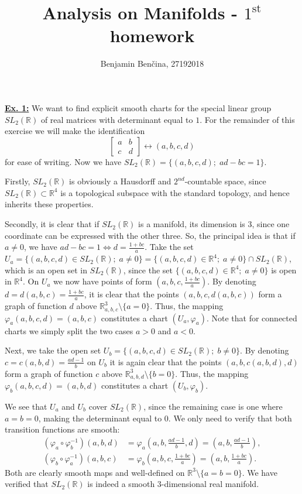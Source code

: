 \documentclass[a4paper, 12pt]{article} %
\title{Analysis on Manifolds - $1^{\text{st}}$ homework}
\author{Benjamin Benčina, 27192018}
\newcommand{\R}{\mathbb{R}}
\begin{document}
\maketitle

\underline{\textbf{Ex. 1:}}
We want to find explicit smooth charts for the special linear group $SL_2(\R)$ of real matrices with determinant equal to $1$. For the remainder of this exercise we will make the identification
\[
\begin{bmatrix}
a & b \\
c & d
\end{bmatrix}
\longleftrightarrow (a, b, c, d)
\]
for ease of writing. Now we have $SL_2(\R) = \lbrace (a, b, c, d) ; \; ad-bc=1\rbrace$.

Firstly, $SL_2(\R)$ is obviously a Hausdorff and $2^{nd}$-countable space, since $SL_2(\R) \subset \R^4$ is a topological subspace with the standard topology, and hence inherits these properties.

Secondly, it is clear that if $SL_2(\R)$ is a manifold, its dimension is $3$, since one coordinate can be expressed with the other three. So, the principal idea is that if $a \neq 0$, we have $ad-bc = 1 \iff d = \frac{1+bc}{a}$. Take the set $U_a = \lbrace (a, b, c, d) \in SL_2(\R) ; \; a \neq 0 \rbrace = \lbrace (a, b, c, d) \in \R^4 ; \; a \neq 0 \rbrace \cap SL_2(\R)$, which is an open set in $SL_2(\R)$, since the set $\lbrace (a, b, c, d) \in \R^4 ; \; a \neq 0\rbrace$ is open in $\R^4$. On $U_a$ we now have points of form $(a, b, c, \frac{1+bc}{a})$. By denoting $d = d(a, b, c) = \frac{1+bc}{a}$, it is clear that the points $(a, b, c, d(a, b, c))$ form a graph of function $d$ above $\R_{a, b, c}^3\setminus\lbrace a = 0\rbrace$. Thus, the mapping $\varphi_a(a, b, c, d) = (a, b, c)$ constitutes a chart $(U_a, \varphi_a)$.
Note that for connected charts we simply split the two cases $a > 0$ and $a < 0$.

Next, we take the open set $U_b = \lbrace (a, b, c, d) \in SL_2(\R);\; b \neq 0\rbrace$. By denoting $c = c(a, b, d) = \frac{ad-1}{b}$ on $U_b$ it is again clear that the points $(a, b, c(a, b, d), d)$ form a graph of function $c$ above $\R_{a, b, d}^3\setminus\lbrace b = 0 \rbrace$. Thus, the mapping $\varphi_b(a, b, c, d) = (a, b, d)$ constitutes a chart $(U_b, \varphi_b)$.

We see that $U_a$ and $U_b$ cover $SL_2(\R)$, since the remaining case is one where $a = b = 0$, making the determinant equal to $0$. We only need to verify that both transition functions are smooth:
\begin{align*}
(\varphi_a\circ\varphi_b^{-1})(a, b, d) &= \varphi_a(a, b, \frac{ad-1}{b}, d) = (a, b, \frac{ad-1}{b}),\\
(\varphi_b\circ\varphi_a^{-1})(a, b, c) &= \varphi_b(a, b, c, \frac{1+bc}{a}) = (a, b, \frac{1+bc}{a}).
\end{align*}
Both are clearly smooth maps and well-defined on $\R^3\setminus\lbrace a = b = 0\rbrace$. We have verified that $SL_2(\R)$ is indeed a smooth $3$-dimensional real manifold.
\newline
\end{document}
